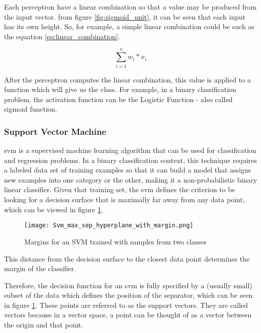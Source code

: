 Each perceptron have a linear combination so that a value may be produced from the input vector. from figure \ref{fig:sigmoid_unit}, it can be seen that each input has its own height. So, for example, a simple linear combination could be such as the equation \ref{eq:linear_combination}.

\begin{equation} 
\label{eq:linear_combination}
\sum_{i=1}^{n} w_{i}*x_{i}
\end{equation}

After the perceptron computes the linear combination, this value is applied to a function which will give us the class. For example, in a binary classification problem, the activation function can be the Logistic Function - also called sigmoid function.

\subsubsection{Support Vector Machine}
\label{subsec:svm}

\Acrfull{svm} is a supervised machine learning algorithm that can be used for classification and regression problems. In a binary classification context, this technique requires a labeled data set of training examples so that it can build a model that assigns new examples into one category or the other, making it a non-probabilistic binary linear classifier.
Given that training set, the \Acrshort{svm} defines the criterion to be looking for a decision surface that is maximally far away from any data point, which can be viewed in figure \ref{fig:svm_margin}. 

\begin{figure}[htpb]
\centering
\texttt{[image: Svm\_max\_sep\_hyperplane\_with\_margin.png]}
\caption{Margins for an SVM trained with samples from two classes}
\label{fig:svm_margin}
\end{figure}

This distance from the decision surface to the closest data point determines the margin of the classifier.

Therefore, the decision function for an \Acrshort{svm} is fully specified by a (usually small) subset of the data which defines the position of the separator, which can be seen in figure \ref{fig:svm_margin}. These points are referred to as the support vectors. They are called vectors because in a vector space, a point can be thought of as a vector between the origin and that point.

